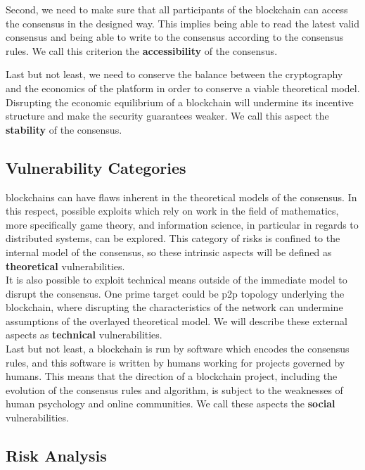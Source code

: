 \documentclass[12pt,a4paper]{article}
\begin{document}
Second, we need to make sure that all participants of the \gls{blockchain} can access the \gls{consensus} in the designed way. This implies being able to read the latest valid \gls{consensus} and being able to write to the \gls{consensus} according to the consensus rules. We call this criterion the \textbf{accessibility} of the \gls{consensus}.

Last but not least, we need to conserve the balance between the cryptography and the economics of the platform in order to conserve a viable theoretical model. Disrupting the economic equilibrium of a \gls{blockchain} will undermine its incentive structure and make the security guarantees weaker. We call this aspect the \textbf{stability} of the \gls{consensus}.

\subsection{Vulnerability Categories}

\Glspl{blockchain} can have flaws inherent in the theoretical models of the \gls{consensus}. In this respect, possible exploits which rely on work in the field of mathematics, more specifically game theory, and information science, in particular in regards to distributed systems, can be explored. This category of risks is confined to the internal model of the \gls{consensus}, so these intrinsic aspects will be defined as \textbf{theoretical} vulnerabilities.\\

It is also possible to exploit technical means outside of the immediate model to disrupt the \gls{consensus}. One prime target could be \acrfull{p2p} topology underlying the \gls{blockchain}, where disrupting the characteristics of the network can undermine assumptions of the overlayed theoretical model. We will describe these external aspects as \textbf{technical} vulnerabilities.\\

Last but not least, a \gls{blockchain} is run by software which encodes the consensus rules, and this software is written by humans working for projects governed by humans. This means that the direction of a blockchain project, including the evolution of the consensus rules and algorithm, is subject to the weaknesses of human psychology and online communities. We call these aspects the \textbf{social} vulnerabilities.\\

\subsection{Risk Analysis}
\end{document}
